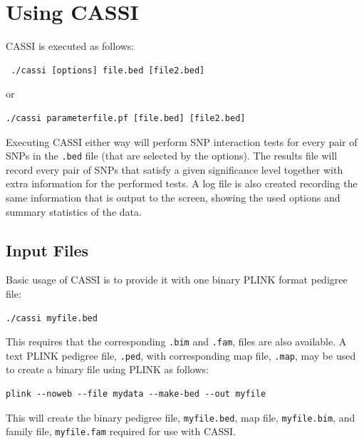 \documentclass[a4paper,12pt]{article}
\newcommand{\code}[1]{{\footnotesize{{\tt #1}}}}
\begin{document}

\section{Using CASSI}
\label{using}

CASSI is executed as follows: 
\vspace{0.35cm} \begin{lstlisting}
 ./cassi [options] file.bed [file2.bed]

\end{lstlisting} \vspace{0.35cm}
or 
\vspace{0.35cm} \begin{lstlisting}
./cassi parameterfile.pf [file.bed] [file2.bed] 
\end{lstlisting} \vspace{0.35cm}
Executing CASSI either way will perform SNP interaction tests for every pair of SNPs in the \code{.bed} file (that are selected by the options). The results file will record every pair of SNPs that satisfy a given significance level together with extra information for the performed tests. A log file is also created recording the same information that is output to the screen, showing the used options and summary statistics of the data. 
\subsection{Input Files}
\label{input}

Basic usage of CASSI is to provide it with one binary PLINK format pedigree file: 
\vspace{0.35cm} \begin{lstlisting}
./cassi myfile.bed 
\end{lstlisting} \vspace{0.35cm}
This requires that the corresponding \code{.bim} and \code{.fam}, files are also available. A text PLINK pedigree file, \code{.ped}, with corresponding map file, \code{.map}, may be used to create a binary file using PLINK as follows: \vspace{0.35cm} \begin{lstlisting}
plink --noweb --file mydata --make-bed --out myfile 
\end{lstlisting} \vspace{0.35cm}

This will create the binary pedigree file, \code{myfile.bed}, map file, \code{myfile.bim}, and family file, \code{myfile.fam} required for use with CASSI. 
\end{document}
